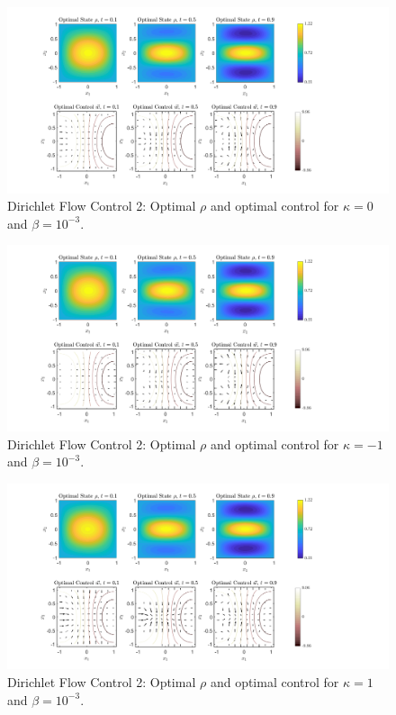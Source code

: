 \documentclass[11pt, a4paper]{article}
\theoremstyle{definition}
\begin{document}
	
	\begin{figure}[h]
		\centering
		\includegraphics[scale=0.35]{FCDk0.png}
		\caption{Dirichlet Flow Control 2: Optimal $\rho$ and optimal control for $\kappa = 0$ and $\beta = 10^{-3}$.} 
		\label{F5a}
	\end{figure}
	\begin{figure}[h]
		\centering
		\includegraphics[scale=0.35]{FCDkn1.png}
		\caption{Dirichlet Flow Control 2: Optimal $\rho$ and optimal control for $\kappa = -1$ and $\beta = 10^{-3}$.} 
		\label{F5b}
	\end{figure}
	\begin{figure}[h]
		\centering
		\includegraphics[scale=0.35]{FCDk1.png}
		\caption{Dirichlet Flow Control 2: Optimal $\rho$ and optimal control for $\kappa = 1$ and $\beta = 10^{-3}$.} 
		\label{F5c}
	\end{figure}
\end{document}
